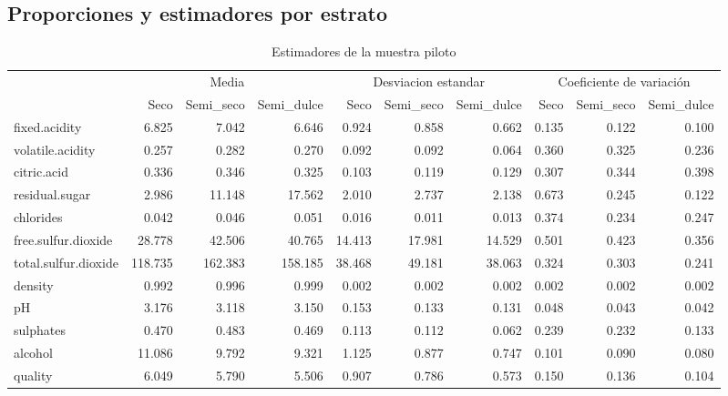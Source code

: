 \documentclass[
]{article}
\begin{document}
\hypertarget{proporciones-y-estimadores-por-estrato}{%
\subsection{Proporciones y estimadores por
estrato}\label{proporciones-y-estimadores-por-estrato}}

\begin{table}[!h]

\caption{\label{tab:gráfica prueba}Estimadores de la muestra piloto}
\centering
\fontsize{6}{8}\selectfont
\begin{tabular}[t]{lrrrrrrrrr}
\toprule
\multicolumn{1}{c}{} & \multicolumn{3}{c}{Media} & \multicolumn{3}{c}{Desviacion estandar} & \multicolumn{3}{c}{Coeficiente de variación} \\
\cmidrule(l{3pt}r{3pt}){2-4} \cmidrule(l{3pt}r{3pt}){5-7} \cmidrule(l{3pt}r{3pt}){8-10}
  & Seco & Semi\_seco & Semi\_dulce & Seco & Semi\_seco & Semi\_dulce & Seco & Semi\_seco & Semi\_dulce\\
\midrule
\rowcolor{gray!6}  fixed.acidity & 6.825 & 7.042 & 6.646 & 0.924 & 0.858 & 0.662 & 0.135 & 0.122 & 0.100\\
volatile.acidity & 0.257 & 0.282 & 0.270 & 0.092 & 0.092 & 0.064 & 0.360 & 0.325 & 0.236\\
\rowcolor{gray!6}  citric.acid & 0.336 & 0.346 & 0.325 & 0.103 & 0.119 & 0.129 & 0.307 & 0.344 & 0.398\\
residual.sugar & 2.986 & 11.148 & 17.562 & 2.010 & 2.737 & 2.138 & 0.673 & 0.245 & 0.122\\
\rowcolor{gray!6}  chlorides & 0.042 & 0.046 & 0.051 & 0.016 & 0.011 & 0.013 & 0.374 & 0.234 & 0.247\\
\addlinespace
free.sulfur.dioxide & 28.778 & 42.506 & 40.765 & 14.413 & 17.981 & 14.529 & 0.501 & 0.423 & 0.356\\
\rowcolor{gray!6}  total.sulfur.dioxide & 118.735 & 162.383 & 158.185 & 38.468 & 49.181 & 38.063 & 0.324 & 0.303 & 0.241\\
density & 0.992 & 0.996 & 0.999 & 0.002 & 0.002 & 0.002 & 0.002 & 0.002 & 0.002\\
\rowcolor{gray!6}  pH & 3.176 & 3.118 & 3.150 & 0.153 & 0.133 & 0.131 & 0.048 & 0.043 & 0.042\\
sulphates & 0.470 & 0.483 & 0.469 & 0.113 & 0.112 & 0.062 & 0.239 & 0.232 & 0.133\\
\addlinespace
\rowcolor{gray!6}  alcohol & 11.086 & 9.792 & 9.321 & 1.125 & 0.877 & 0.747 & 0.101 & 0.090 & 0.080\\
quality & 6.049 & 5.790 & 5.506 & 0.907 & 0.786 & 0.573 & 0.150 & 0.136 & 0.104\\
\bottomrule
\end{tabular}
\end{table}
\end{document}

